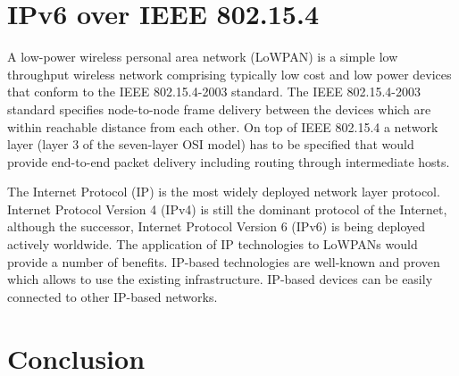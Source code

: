 \documentclass[12pt, titlepage, a4paper]{report}
\begin{document}
\chapter{IPv6 over IEEE 802.15.4}
A low-power wireless personal area network (LoWPAN) is a simple low throughput wireless network comprising typically low cost and low power devices that conform to the IEEE 802.15.4-2003 standard. The IEEE 802.15.4-2003 standard specifies node-to-node frame delivery between the devices which are within reachable distance from each other. On top of IEEE 802.15.4 a network layer (layer 3 of the seven-layer OSI model) has to be specified that would provide end-to-end packet delivery including routing through intermediate hosts. 

The Internet Protocol (IP) is the most widely deployed network layer protocol. Internet Protocol Version 4 (IPv4) is still the dominant protocol of the Internet, although the successor, Internet Protocol Version 6 (IPv6) \cite{rfc2460} is being deployed actively worldwide. The application of IP technologies to LoWPANs would provide a number of benefits. IP-based technologies are well-known and proven which allows to use the existing infrastructure. IP-based devices can be easily connected to other IP-based networks.






\chapter*{Conclusion}

\newpage



\nocite{ieee802.15.4} 
\nocite{rfc2460} 
\nocite{rfc4291} 
\nocite{rfc4443}
\nocite{rfc4861}
\nocite{rfc4862}
\nocite{rfc4919}
\nocite{rfc4944} 
\nocite{draft-usecases-05} 
\nocite{draft-hc-06} 
\nocite{draft-nd-06}
\end{document}
